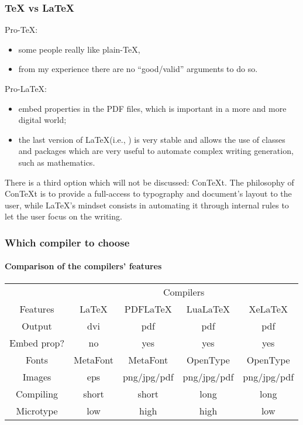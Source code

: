 \documentclass[11pt]{beamer}
\begin{document}
\begin{frame}
	\frametitle{\TeX{} vs \LaTeX{}}
	
	Pro-\TeX{}:
	\begin{itemize}
		\item some people really like plain-\TeX{},
		\item from my experience there are no \enquote{good/valid} arguments to do so.
	\end{itemize}

	Pro-\LaTeX{}:
	\begin{itemize}
		\item embed properties in the PDF files, which is important in a more and more digital world;
		\item the last version of \LaTeX (i.e., \LaTeXe{}) is very stable and allows the use of classes and packages which are very useful to automate complex writing generation, such as mathematics.
	\end{itemize}

	There is a third option which will not be discussed: ConTeXt. The philosophy of ConTeXt is to provide a full-access to typography and document's layout to the user, while \LaTeX{}'s mindset consists in automating it through internal rules to let the user focus on the writing.
\end{frame}


\begin{frame}
	\frametitle{Which compiler to choose}
	\framesubtitle{Comparison of the compilers' features}
	
	\begin{table}
		\begin{tabular}{*{5}{c}} \toprule
			&\multicolumn{4}{c}{Compilers} \\ \cmidrule(l){2-5}
			Features	& LaTeX		& PDFLaTeX	& LuaLaTeX	& XeLaTeX	\\ \midrule
			Output		& dvi		& pdf   	& pdf   	& pdf   	\\ 
			Embed prop?	& no		& yes		& yes		& yes 		\\ 
			Fonts   	& MetaFont	& MetaFont	& OpenType	& OpenType 	\\
			Images		& eps		& png/jpg/pdf & png/jpg/pdf & png/jpg/pdf \\
			Compiling	& short		& short		& long		& long		\\
			Microtype	& low		& high		& high		& low		\\ \bottomrule
		\end{tabular}
	\end{table}
\end{frame}
\end{document}
